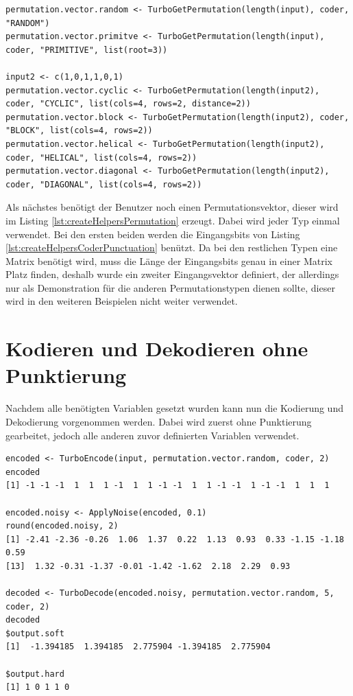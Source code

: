 \begin{lstlisting}[caption=Erzeugung von verschiedenen Permutationsvektoren, label={lst:createHelpersPermutation}, float=!ht]
permutation.vector.random <- TurboGetPermutation(length(input), coder, "RANDOM")
permutation.vector.primitve <- TurboGetPermutation(length(input), coder, "PRIMITIVE", list(root=3))

input2 <- c(1,0,1,1,0,1)
permutation.vector.cyclic <- TurboGetPermutation(length(input2), coder, "CYCLIC", list(cols=4, rows=2, distance=2))
permutation.vector.block <- TurboGetPermutation(length(input2), coder, "BLOCK", list(cols=4, rows=2))
permutation.vector.helical <- TurboGetPermutation(length(input2), coder, "HELICAL", list(cols=4, rows=2))
permutation.vector.diagonal <- TurboGetPermutation(length(input2), coder, "DIAGONAL", list(cols=4, rows=2))
\end{lstlisting}

Als nächstes benötigt der Benutzer noch einen Permutationsvektor, dieser wird im Listing \ref{lst:createHelpersPermutation} erzeugt. Dabei wird jeder Typ einmal verwendet. Bei den ersten beiden werden die Eingangsbits von Listing \ref{lst:createHelpersCoderPunctuation} benützt. Da bei den restlichen Typen eine Matrix benötigt wird, muss die Länge der Eingangsbits genau in einer Matrix Platz finden, deshalb wurde ein zweiter Eingangsvektor definiert, der allerdings nur als Demonstration für die anderen Permutationstypen dienen sollte, dieser wird in den weiteren Beispielen nicht weiter verwendet.

\section{Kodieren und Dekodieren ohne Punktierung}
\label{sec:example_withoutPunctuation}
Nachdem alle benötigten Variablen gesetzt wurden kann nun die Kodierung und Dekodierung vorgenommen werden. Dabei wird zuerst ohne Punktierung gearbeitet, jedoch alle anderen zuvor definierten Variablen verwendet.

\begin{lstlisting}[caption=Kodierung und Dekodierung ohne Punktierung, label={lst:encodeDecodeWithoutPunctuation}, float=!ht]
encoded <- TurboEncode(input, permutation.vector.random, coder, 2)
encoded
[1] -1 -1 -1  1  1  1 -1  1  1 -1 -1  1  1 -1 -1  1 -1 -1  1  1  1

encoded.noisy <- ApplyNoise(encoded, 0.1)
round(encoded.noisy, 2)
[1] -2.41 -2.36 -0.26  1.06  1.37  0.22  1.13  0.93  0.33 -1.15 -1.18  0.59
[13]  1.32 -0.31 -1.37 -0.01 -1.42 -1.62  2.18  2.29  0.93

decoded <- TurboDecode(encoded.noisy, permutation.vector.random, 5, coder, 2)
decoded
$output.soft
[1]  -1.394185  1.394185  2.775904 -1.394185  2.775904

$output.hard
[1] 1 0 1 1 0
\end{lstlisting}

